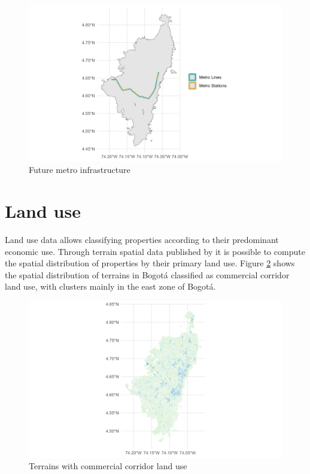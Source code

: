 \documentclass[12pt, a4paper]{report}
\begin{document}
\begin{figure}[H]
    \centering
    \includegraphics[width=15cm]{Data/Results/Images/Metro_Network.png}
    \caption{Future metro infrastructure \citep{alcaldiadebogotad.c.EstacionesPrimeraLinea2022, alcaldiadebogotad.c.TrazadoPrimeraLinea2022}}
    \label{fig:Metro_Network}
\end{figure}

\section{Land use}

Land use data allows classifying properties according to their predominant economic use. Through terrain spatial data published by \cite{alcaldiadebogotad.c.DestinoEconomicoPredominante2022} it is possible to compute the spatial distribution of properties by their primary land use. Figure \ref{fig:Land_Use_Commercial} shows the spatial distribution of terrains in Bogotá classified as commercial corridor land use, with clusters mainly in the east zone of Bogotá. 

\begin{figure}[H]
    \centering
    \includegraphics[width=15cm]{Data/Results/Images/Land_Use_Commercial_Corridor_Terrain.png}
    \caption{Terrains with commercial corridor land use \citep{alcaldiadebogotad.c.DestinoEconomicoPredominante2022}}
    \label{fig:Land_Use_Commercial}
\end{figure}
\end{document}
